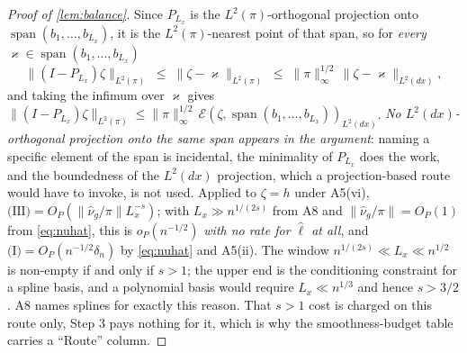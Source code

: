 \begin{proof}[Proof of \cref{lem:balance}]
Since $P_{L_x}$ is the $L^{2}(\pi)$-orthogonal projection
onto $\operatorname{span}(b_1,\dots,b_{L_x})$, it is the $L^{2}(\pi)$-nearest point of that span, so for
\emph{every} $\varkappa\in\operatorname{span}(b_1,\dots,b_{L_x})$
\[
\big\|(I-P_{L_x})\zeta\big\|_{L^{2}(\pi)}\;\le\;\big\|\zeta-\varkappa\big\|_{L^{2}(\pi)}
\;\le\;\|\pi\|_\infty^{1/2}\,\big\|\zeta-\varkappa\big\|_{L^{2}(dx)} ,
\]
and taking the infimum over $\varkappa$ gives
$\|(I-P_{L_x})\zeta\|_{L^{2}(\pi)}\le\|\pi\|_\infty^{1/2}\,
\mathcal E(\zeta,\operatorname{span}(b_1,\dots,b_{L_x}))_{L^{2}(dx)}$.
\emph{No $L^{2}(dx)$-orthogonal projection onto the same span appears in the argument}: naming a specific
element of the span is incidental, the minimality of $P_{L_x}$ does the work, and the boundedness of the
$L^{2}(dx)$ projection, which a projection-based route would have to invoke, is not used. Applied to
$\zeta=h$ under A5(vi), $\text{(III)}=O_P(\|\hat\nu_g/\pi\|L_x^{-s})$; with
$L_x\gg n^{1/(2s)}$ from A8 and $\|\hat\nu_g/\pi\|=O_P(1)$ from \eqref{eq:nuhat}, this is
$o_P(n^{-1/2})$ \emph{with no rate for $\hat\ell$ at all}, and $\text{(I)}=O_P(n^{-1/2}\delta_n)$ by
\eqref{eq:nuhat} and A5(ii). The window $n^{1/(2s)}\ll L_x\ll n^{1/2}$ is non-empty if and only if
$s>1$; the upper end is the conditioning constraint for a spline basis, and a polynomial basis would
require $L_x\ll n^{1/3}$ and hence $s>3/2$. A8 names splines for exactly this reason. That $s>1$ cost is
charged on this route only, Step 3 pays nothing for it, which is why the smoothness-budget table
carries a ``Route'' column.


\end{proof}
